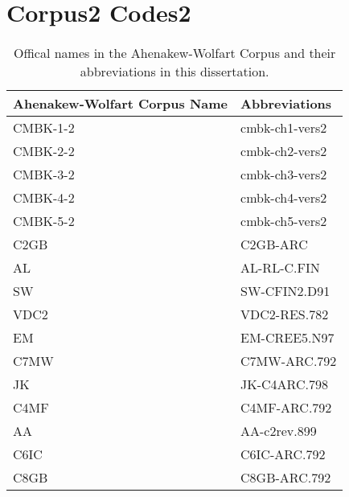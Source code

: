 \chapter{Corpus2 Codes2}
\label{a:2corpcode}
\begin{table}
  \centering
  \begin{tabular}{ll}
    \toprule
     Ahenakew-Wolfart Corpus Name & Abbreviations           \\
    \midrule
    CMBK-1-2 & cmbk-ch1-vers2 \\
    CMBK-2-2 & cmbk-ch2-vers2 \\
    CMBK-3-2 & cmbk-ch3-vers2 \\
    CMBK-4-2 & cmbk-ch4-vers2 \\
    CMBK-5-2 & cmbk-ch5-vers2 \\
    C2GB & C2GB-ARC \\
    AL & AL-RL-C.FIN \\
    SW & SW-CFIN2.D91 \\
    VDC2 & VDC2-RES.782 \\
    EM & EM-CREE5.N97 \\
    C7MW & C7MW-ARC.792 \\
    JK & JK-C4ARC.798 \\
    C4MF & C4MF-ARC.792 \\
    AA & AA-c2rev.899 \\
    C6IC & C6IC-ARC.792 \\
    C8GB & C8GB-ARC.792 \\
    
    \bottomrule
  \end{tabular}
  \caption{
    Offical names in the Ahenakew-Wolfart Corpus and their abbreviations in this dissertation. \label{Tab:CorpusCodes}
  }
\end{table}
